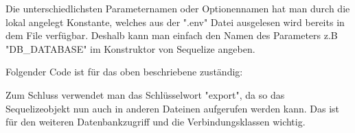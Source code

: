Die unterschiedlichsten Parameternamen oder Optionennamen hat man durch die lokal angelegt Konstante, welches aus der ".env" Datei ausgelesen wird bereits in dem File verfügbar. Deshalb kann man einfach den Namen des Parameters z.B "DB\_DATABASE" im Konstruktor von Sequelize angeben.

Folgender Code ist für das oben beschriebene zuständig:


Zum Schluss verwendet man das Schlüsselwort "export", da so das Sequelizeobjekt nun auch in anderen Dateinen aufgerufen werden kann. Das ist für den weiteren Datenbankzugriff und die Verbindungsklassen wichtig.


